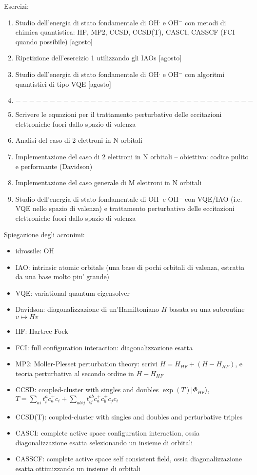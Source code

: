 \documentclass{article}
\begin{document}
Esercizi:
\begin{enumerate}
\item Studio dell'energia di stato fondamentale di OH$^{.}$ e OH$^{-}$ con metodi di chimica quantistica: HF, MP2, CCSD, CCSD(T), CASCI, CASSCF (FCI quando possibile) [agosto]
\item Ripetizione dell'esercizio 1 utilizzando gli IAOs [agosto]
\item Studio dell'energia di stato fondamentale di OH$^{.}$ e OH$^{-}$ con algoritmi quantistici di tipo VQE [agosto]
\item $-----------------------------------$
\item Scrivere le equazioni per il trattamento perturbativo delle eccitazioni elettroniche fuori dallo spazio di valenza
\item Analisi del caso di 2 elettroni in N orbitali
\item Implementazione del caso di 2 elettroni in N orbitali -- obiettivo: codice pulito e performante (Davidson)
\item Implementazione del caso generale di M elettroni in N orbitali 
\item Studio dell'energia di stato fondamentale di OH$^{.}$ e OH$^{-}$ con VQE/IAO (i.e. VQE nello spazio di valenza) e trattamento perturbativo delle eccitazioni elettroniche fuori dallo spazio di valenza 
\end{enumerate}

Spiegazione degli acronimi:
\begin{itemize}
\item idrossile: OH
\item IAO: intrinsic atomic orbitals (una base di pochi orbitali di valenza, estratta da una base molto piu' grande)
\item VQE: variational quantum eigensolver
\item Davidson: diagonalizzazione di un'Hamiltoniano $H$ basata su una subroutine $v \mapsto Hv$
\item HF: Hartree-Fock
\item FCI: full configuration interaction: diagonalizzazione esatta
\item MP2: Moller-Plesset perturbation theory: scrivi $H = H_{HF} + (H - H_{HF})$, e teoria perturbativa al secondo ordine in $H - H_{HF}$
\item CCSD: coupled-cluster with singles and doubles $\exp(T) | \Phi_{HF} \rangle$, $T = \sum_{ai} t^a_i c_a^+ c_i + \sum_{abij} t^{ab}_{ij} c_a^+ c_b^+ c_j c_i$
\item CCSD(T): coupled-cluster with singles and doubles and perturbative triples
\item CASCI: complete active space configuration interaction, ossia diagonalizzazione esatta selezionando un insieme di orbitali 
\item CASSCF: complete active space self consistent field, ossia diagonalizzazione esatta ottimizzando un insieme di orbitali 
\end{itemize}
\end{document}
